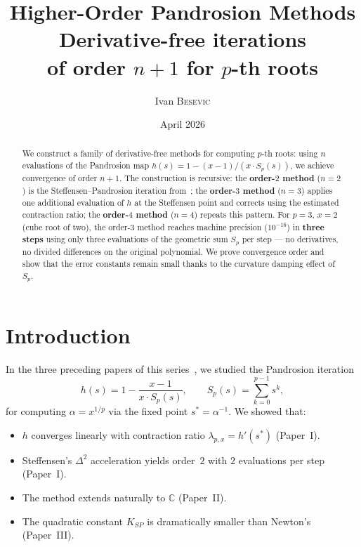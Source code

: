 \documentclass[11pt,a4paper]{article}
\title{\textbf{Higher-Order Pandrosion Methods}\\[0.3em]
  \large Derivative-free iterations\\
  of order $n+1$ for $p$-th roots}
\author{Ivan \textsc{Besevic}}
\date{April 2026}
\theoremstyle{definition}
\newcommand{\CC}{\mathbb{C}}
\begin{document}
\maketitle

\begin{abstract}
We construct a family of derivative-free methods for computing $p$-th roots: using $n$ evaluations of the Pandrosion map $h(s) = 1 - (x-1)/(x\cdot S_p(s))$, we achieve convergence of order $n+1$.  The construction is recursive: the \textbf{order-$2$ method} ($n=2$) is the Steffensen--Pandrosion iteration from~\cite{besevic2026}; the \textbf{order-$3$ method} ($n=3$) applies one additional evaluation of $h$ at the Steffensen point and corrects using the estimated contraction ratio; the \textbf{order-$4$ method} ($n=4$) repeats this pattern.  For $p=3$, $x=2$ (cube root of two), the order-$3$ method reaches machine precision ($10^{-16}$) in \textbf{three steps} using only three evaluations of the geometric sum $S_p$ per step --- no derivatives, no divided differences on the original polynomial.  We prove convergence order and show that the error constants remain small thanks to the curvature damping effect of $S_p$.
\end{abstract}

\tableofcontents
\bigskip

\section{Introduction}

In the three preceding papers of this series~\cite{besevic2026,besevic2026b,besevic2026c}, we studied the Pandrosion iteration
\begin{equation}
  \label{eq:pandrosion}
  h(s) = 1 - \frac{x-1}{x \cdot S_p(s)},
  \qquad S_p(s) = \sum_{k=0}^{p-1} s^k,
\end{equation}
for computing $\alpha = x^{1/p}$ via the fixed point $s^* = \alpha^{-1}$.  We showed that:
\begin{itemize}
  \item $h$ converges linearly with contraction ratio $\lambda_{p,x} = h'(s^*)$ (Paper~I).
  \item Steffensen's $\Delta^2$ acceleration yields order~$2$ with $2$ evaluations per step (Paper~I).
  \item The method extends naturally to $\CC$ (Paper~II).
  \item The quadratic constant $K_{SP}$ is dramatically smaller than Newton's (Paper~III).
\end{itemize}
\end{document}
